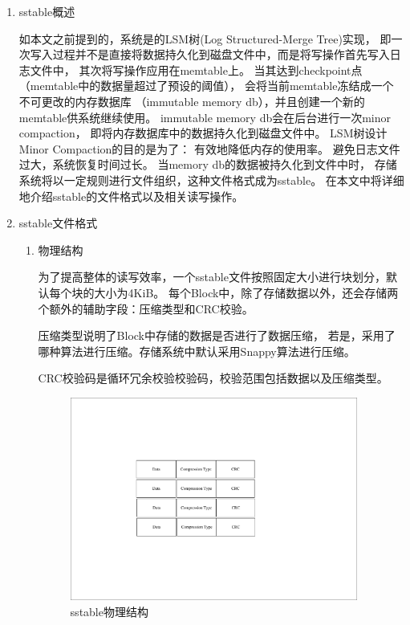 			\begin{enumerate}
				\item sstable概述
				
				如本文之前提到的，系统是的LSM树(Log Structured-Merge Tree)实现，
				即一次写入过程并不是直接将数据持久化到磁盘文件中，而是将写操作首先写入日志文件中，
				其次将写操作应用在memtable上。
				当其达到checkpoint点（memtable中的数据量超过了预设的阈值），
				会将当前memtable冻结成一个不可更改的内存数据库
				（immutable memory db），并且创建一个新的memtable供系统继续使用。
				immutable memory db会在后台进行一次minor compaction，
				即将内存数据库中的数据持久化到磁盘文件中。
				LSM树设计Minor Compaction的目的是为了：
				有效地降低内存的使用率。
				避免日志文件过大，系统恢复时间过长。
				当memory db的数据被持久化到文件中时，
				存储系统将以一定规则进行文件组织，这种文件格式成为sstable。
				在本文中将详细地介绍sstable的文件格式以及相关读写操作。

				\item sstable文件格式
				

				\begin{enumerate}
					\item 物理结构

					为了提高整体的读写效率，一个sstable文件按照固定大小进行块划分，默认每个块的大小为4KiB。
					每个Block中，除了存储数据以外，还会存储两个额外的辅助字段：压缩类型和CRC校验。
	
					压缩类型说明了Block中存储的数据是否进行了数据压缩，
					若是，采用了哪种算法进行压缩。存储系统中默认采用Snappy算法进行压缩。
	
					CRC校验码是循环冗余校验校验码，校验范围包括数据以及压缩类型。
					
					\begin{figure}[H]
						\centering
						\includegraphics[width=0.95\textwidth]{pdf/sstable_physic.pdf}
						\caption{sstable物理结构}
						\label{sstable_physic}
					\end{figure}
					

\end{enumerate}
\end{enumerate}
